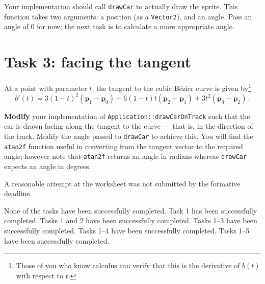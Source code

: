 \documentclass{../../../fal_assignment}
\begin{document}
Your implementation should call \lstinline{drawCar} to actually draw the sprite.
This function takes two arguments: a position (as a \lstinline{Vector2}), and an angle.
Pass an angle of 0 for now; the next task is to calculate a more appropriate angle.

\section*{Task 3: facing the tangent}

At a point with parameter $t$, the tangent to the cubic B\'ezier curve is given by\footnote{Those of you who know calculus can verify that this is the derivative of $b(t)$ with respect to $t$.}
$$ b'(t) = 3(1-t)^2(\mathbf{p}_1 - \mathbf{p}_0) + 6(1-t)t(\mathbf{p}_2 - \mathbf{p}_1) + 3t^2 (\mathbf{p}_3 - \mathbf{p}_2) \,. $$

\textbf{Modify} your implementation of \lstinline{Application::drawCarOnTrack} such that the car is drawn
facing along the tangent to the curve --- that is, in the direction of the track.
Modify the angle passed to \lstinline{drawCar} to achieve this.
You will find the \lstinline{atan2f} function useful in converting from the tangent vector to the required
angle; however note that \lstinline{atan2f} returns an angle in radians whereas \lstinline{drawCar}
expects an angle in degrees.


\begin{markingrubric}
		\grade\fail	A reasonable attempt at the worksheet was not submitted by the formative deadline.
		
        \grade\fail None of the tasks have been successfully completed.
		\grade Task 1 has been successfully completed.
		\grade Tasks 1 and 2 have been successfully completed.
		\grade Tasks 1--3 have been successfully completed.
		\grade Tasks 1--4 have been successfully completed.
		\grade Tasks 1--5 have been successfully completed.
\end{markingrubric}
\end{document}
